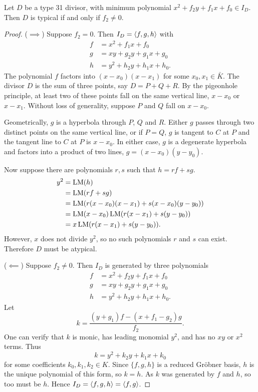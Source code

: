 \begin{theorem}
  \label{thm_typical_type_31_divisors}
  Let $D$ be a type 31 divisor, with minimum polynomial $x^2 + f_2y + f_1x + f_0 \in I_D$.
  Then $D$ is typical if and only if $f_2 \neq 0$.
\end{theorem}

\begin{proof}
  ($\implies$)
  Suppose $f_2 = 0$.
  Then $I_D = \left\langle f, g, h \right\rangle$ with
  \begin{align*}
    f &= x^2 + f_1x + f_0 \\
    g &= xy  + g_2y + g_1x + g_0 \\
    h &= y^2 + h_2y + h_1x + h_0.
  \end{align*}
  The polynomial $f$ factors into $(x - x_0)(x - x_1)$ for some $x_0, x_1 \in \bar K$.
  The divisor $D$ is the sum of three points, say $D = P + Q + R$.
  By the pigeonhole principle, at least two of these points fall on the same vertical line, $x - x_0$ or $x - x_1$.
  Without loss of generality, suppose $P$ and $Q$ fall on $x - x_0$.
  
  Geometrically, $g$ is a hyperbola through $P$, $Q$ and $R$.
  Either $g$ passes through two distinct points on the same vertical line,
  or if $P = Q$, $g$ is tangent to $C$ at $P$ and the tangent line to $C$ at $P$ is $x - x_0$.
  In either case, $g$ is a degenerate hyperbola and factors into a product of two lines, $g = (x - x_0)(y - y_0)$.
  
  Now suppose there are polynomials $r, s$ such that $h = rf + sg$.
  \begin{align*}
    y^2 &= \operatorname{LM}(h) \\
        &= \operatorname{LM}(rf + sg) \\
        &= \operatorname{LM}(r(x - x_0)(x - x_1) + s(x - x_0)(y - y_0)) \\
        &= \operatorname{LM}(x - x_0)\operatorname{LM}(r(x - x_1) + s(y - y_0)) \\
        &= x\operatorname{LM}(r(x - x_1) + s(y - y_0)).
  \end{align*}
  However, $x$ does not divide $y^2$, so no such polynomials $r$ and $s$ can exist.
  Therefore $D$ must be atypical.
  
  ($\impliedby$)
  Suppose $f_2 \neq 0$.
  Then $I_D$ is generated by three polynomials
  \begin{align*}
    f &= x^2 + f_2y + f_1x + f_0 \\
    g &= xy  + g_2y + g_1x + g_0 \\
    h &= y^2 + h_2y + h_1x + h_0.
  \end{align*}
  Let
  \[ k = \frac {(y + g_1)f - (x + f_1 - g_2)g} {f_2}. \]
  One can verify that $k$ is monic, has leading monomial $y^2$,
  and has no $xy$ or $x^2$ terms. Thus
  \[ k = y^2 + k_2y + k_1x + k_0 \]
  for some coefficients $k_0, k_1, k_2 \in K$.
  Since $\{f,g,h\}$ is a reduced Gr\"obner basis, $h$ is the unique polynomial of this form, so $k = h$.
  As $k$ was generated by $f$ and $h$, so too must be $h$.
  Hence $I_D = \left\langle f,g,h \right\rangle = \left\langle f,g \right\rangle$.
\end{proof}

